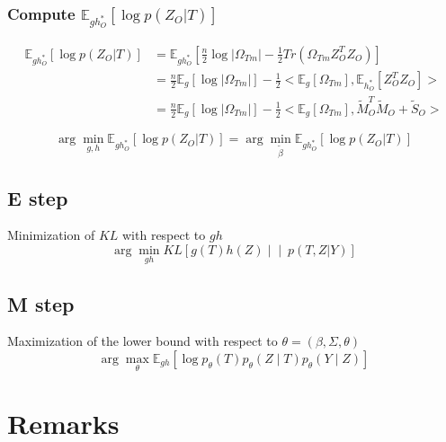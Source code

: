 \documentclass[11pt,a4paper]{article}
\newcommand{\argmax}{\arg\!\max}
\newcommand{\argmin}{\arg\!\min}
\newcommand{\Esp}{\mathds{E}}
\begin{document}
\subsubsection{Compute $ \Esp_{gh_O^*}[\log p(Z_O|T)]$}
\begin{align*}
 \Esp_{gh_O^*}[\log p(Z_O|T)] &=  \Esp_{gh_O^*}[ \frac{n}{2} \log |\Omega_{Tm}| - \frac{1}{2} Tr( \Omega_{Tm} Z_O^TZ_O) ]\\
 &= \frac{n}{2} \Esp_g[\log |\Omega_{Tm}|] - \frac{1}{2} < \Esp_g[\Omega_{Tm}], \Esp_{h_O^*}[ Z_O^TZ_O] > \\
&= \frac{n}{2} \Esp_g[\log |\Omega_{Tm}|] - \frac{1}{2} < \Esp_g[\Omega_{Tm}], \widetilde{M}_O^T\widetilde{M}_O + \widetilde{S}_O> 
\end{align*}

$$\argmin_{g,h}  \Esp_{gh_O^*}[\log p(Z_O|T)] = \argmin_{\widetilde{\beta} } \Esp_{gh_O^*}[\log p(Z_O|T)]$$
\subsection{E step}
Minimization of $KL$ with respect to $gh$
$$  \argmin_{gh}  KL\left[g(T) h(Z) \middle\vert\middle\vert\ p(T,Z | Y)\right]$$

\subsection{M step}
Maximization of the lower bound with respect to $\theta=(\beta,\Sigma,\theta)$
$$ \argmax_\theta \Esp_{gh} [\log p_\theta(T)p_\theta(Z\mid T)p_\theta(Y\mid Z)] $$


\section*{Remarks}


\newpage

\end{document}
